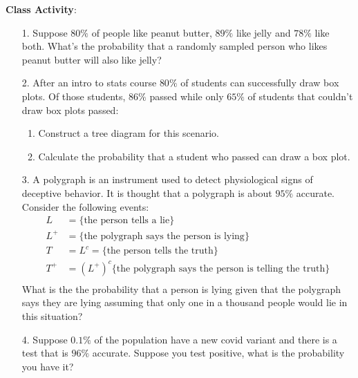 \documentclass[oneside]{amsart}
\theoremstyle{definition}
\theoremstyle{definition}
\begin{document}
{\Large \textbf{ Class Activity}:}
\\
\begin{enumerate}
 \item[1.] Suppose $80 \%$ of people like peanut butter, $89 \%$ like jelly and $78 \%$ like both. What's the probability that a randomly sampled person who likes peanut butter will also like jelly?
    \vfill

    \item[2.] After an intro to stats course $80 \%$ of students can successfully draw box plots. Of those students, $86 \%$ passed while only $65 \%$ of students that couldn't draw box plots passed: 
    \begin{enumerate}
        \item Construct a tree diagram for this scenario.

        \vfill

        \item Calculate the probability that a student who passed can draw a box plot.
   
        \vfill


    \end{enumerate}

   \newpage

    \item[3.] A polygraph is an instrument used to detect physiological signs of deceptive behavior. It is thought that a polygraph is about $95 \%$ accurate. Consider the following events:
    \begin{align*}
        L &= \{ \text{the person tells a lie} \} \\
        L^+ &= \{ \text{the polygraph says the person is lying} \} \\
        T &= L^c =  \{ \text{the person tells the truth} \} \\
        T^+ &= (L^+)^c \{ \text{the polygraph says the person is telling the truth} \} \\
    \end{align*}
        What is the the probability that a person is lying given that the polygraph says they are lying assuming that only one in a thousand people would lie in this situation?

        \vfill

        \item[4.] Suppose $0.1 \%$ of the population have a new covid variant and there is a test that is $96 \%$ accurate. Suppose you test positive, what is the probability you have it?

        \vfill


\end{enumerate}
\end{document}
